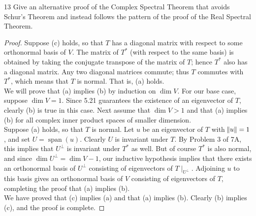 \documentclass{extarticle}
\newenvironment{problem}[1]{\begin{prob*}{#1}{}}{\end{prob*}}
\DeclareMathOperator{\Span}{span}
\begin{document}
\begin{problem}{13}
Give an alternative proof of the Complex Spectral Theorem that avoids Schur's Theorem and instead follows the pattern of the proof of the Real Spectral Theorem.
\end{problem}
\begin{proof}
Suppose (c) holds, so that $T$ has a diagonal matrix with respect to some orthonormal basis of $V$.  The matrix of $T^\ast$ (with respect to the same basis) is obtained by taking the conjugate transpose of the matrix of $T$; hence $T^\ast$ also has a diagonal matrix.  Any two diagonal matrices commute; thus $T$ commutes with $T^\ast$, which means that $T$ is normal.  That is, (a) holds.\\
\indent We will prove that (a) implies (b) by induction on $\dim V$.  For our base case, suppose $\dim V= 1$.  Since 5.21 guarantees the existence of an eigenvector of $T$, clearly (b) is true in this case.  Next assume that $\dim V > 1$ and that (a) implies (b) for all complex inner product spaces of smaller dimension.\\
\indent Suppose (a) holds, so that $T$ is normal.  Let $u$ be an eigenvector of $T$ with $\norm{u} = 1$, and set $U = \Span(u)$.  Clearly $U$ is invariant under $T$.  By Problem 3 of 7A, this implies that $U^\perp$ is invariant under $T^\ast$ as well.  But of course $T^\ast$ is also normal, and since $\dim U^\perp = \dim V - 1$, our inductive hypothesis implies that there exists an orthonormal basis of $U^\perp$ consisting of eigenvectors of $T\mid_{U^\perp}$.  Adjoining $u$ to this basis gives an orthonormal basis of $V$ consisting of eigenvectors of $T$, completing the proof that (a) implies (b).\\
\indent We have proved that (c) implies (a) and that (a) implies (b).  Clearly (b) implies (c), and the proof is complete.
\end{proof}
\end{document}
